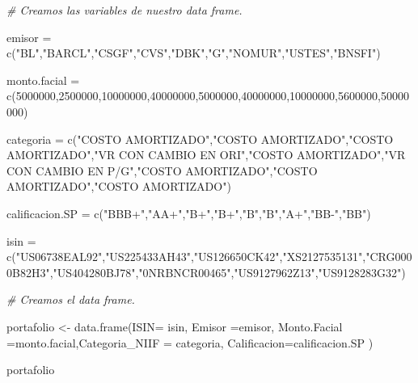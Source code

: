 \documentclass[
  12pt,
]{book}
\newenvironment{Shaded}{\begin{snugshade}}{\end{snugshade}}
\newcommand{\AttributeTok}[1]{\textcolor[rgb]{0.77,0.63,0.00}{#1}}
\newcommand{\CommentTok}[1]{\textcolor[rgb]{0.56,0.35,0.01}{\textit{#1}}}
\newcommand{\DecValTok}[1]{\textcolor[rgb]{0.00,0.00,0.81}{#1}}
\newcommand{\FunctionTok}[1]{\textcolor[rgb]{0.00,0.00,0.00}{#1}}
\newcommand{\NormalTok}[1]{#1}
\newcommand{\OtherTok}[1]{\textcolor[rgb]{0.56,0.35,0.01}{#1}}
\newcommand{\StringTok}[1]{\textcolor[rgb]{0.31,0.60,0.02}{#1}}
\begin{document}
\begin{Shaded}
\begin{Highlighting}[]
\CommentTok{\# Creamos las variables de nuestro data frame.}

\NormalTok{emisor }\OtherTok{=} \FunctionTok{c}\NormalTok{(}\StringTok{"BL"}\NormalTok{,}\StringTok{"BARCL"}\NormalTok{,}\StringTok{"CSGF"}\NormalTok{,}\StringTok{"CVS"}\NormalTok{,}\StringTok{"DBK"}\NormalTok{,}\StringTok{"G"}\NormalTok{,}\StringTok{"NOMUR"}\NormalTok{,}\StringTok{"USTES"}\NormalTok{,}\StringTok{"BNSFI"}\NormalTok{)}

\NormalTok{monto.facial }\OtherTok{=} \FunctionTok{c}\NormalTok{(}\DecValTok{5000000}\NormalTok{,}\DecValTok{2500000}\NormalTok{,}\DecValTok{10000000}\NormalTok{,}\DecValTok{40000000}\NormalTok{,}\DecValTok{5000000}\NormalTok{,}\DecValTok{40000000}\NormalTok{,}\DecValTok{10000000}\NormalTok{,}\DecValTok{5600000}\NormalTok{,}\DecValTok{50000000}\NormalTok{)}

\NormalTok{categoria }\OtherTok{=} \FunctionTok{c}\NormalTok{(}\StringTok{"COSTO AMORTIZADO"}\NormalTok{,}\StringTok{"COSTO AMORTIZADO"}\NormalTok{,}\StringTok{"COSTO AMORTIZADO"}\NormalTok{,}\StringTok{"VR CON CAMBIO EN ORI"}\NormalTok{,}\StringTok{"COSTO AMORTIZADO"}\NormalTok{,}\StringTok{"VR CON CAMBIO EN P/G"}\NormalTok{,}\StringTok{"COSTO AMORTIZADO"}\NormalTok{,}\StringTok{"COSTO AMORTIZADO"}\NormalTok{,}\StringTok{"COSTO AMORTIZADO"}\NormalTok{)}

\NormalTok{calificacion.SP }\OtherTok{=} \FunctionTok{c}\NormalTok{(}\StringTok{"BBB+"}\NormalTok{,}\StringTok{"AA+"}\NormalTok{,}\StringTok{"B+"}\NormalTok{,}\StringTok{"B+"}\NormalTok{,}\StringTok{"B"}\NormalTok{,}\StringTok{"B"}\NormalTok{,}\StringTok{"A+"}\NormalTok{,}\StringTok{"BB{-}"}\NormalTok{,}\StringTok{"BB"}\NormalTok{)}

\NormalTok{isin }\OtherTok{=} \FunctionTok{c}\NormalTok{(}\StringTok{"US06738EAL92"}\NormalTok{,}\StringTok{"US225433AH43"}\NormalTok{,}\StringTok{"US126650CK42"}\NormalTok{,}\StringTok{"XS2127535131"}\NormalTok{,}\StringTok{"CRG0000B82H3"}\NormalTok{,}\StringTok{"US404280BJ78"}\NormalTok{,}\StringTok{"0NRBNCR00465"}\NormalTok{,}\StringTok{"US9127962Z13"}\NormalTok{,}\StringTok{"US9128283G32"}\NormalTok{)}


\CommentTok{\# Creamos el data frame.}

\NormalTok{portafolio }\OtherTok{\textless{}{-}} \FunctionTok{data.frame}\NormalTok{(}\AttributeTok{ISIN=}\NormalTok{ isin, }\AttributeTok{Emisor =}\NormalTok{emisor, }\AttributeTok{Monto.Facial =}\NormalTok{monto.facial,}\AttributeTok{Categoria\_NIIF =}\NormalTok{ categoria, }\AttributeTok{Calificacion=}\NormalTok{calificacion.SP )}
           
           
\NormalTok{portafolio}
\end{Highlighting}
\end{Shaded}
\end{document}

